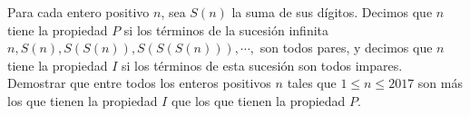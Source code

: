 Para cada entero positivo $n$, sea $S(n)$ la suma de sus dígitos. Decimos que $n$ tiene la propiedad $P$ si los términos de la sucesión infinita $n,S(n),S(S(n)),S(S(S(n))),\cdots ,$ son todos pares, y decimos que $n$ tiene la propiedad $I$ si los términos de esta sucesión son todos impares. Demostrar que entre todos los enteros positivos $n$ tales que $1 \leq n \leq 2017$ son más los que tienen la propiedad $I$ que los que tienen la propiedad $P$.
